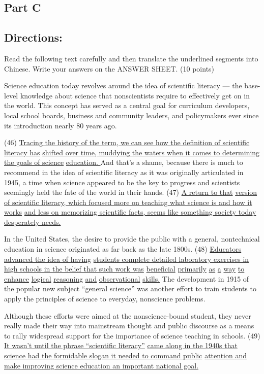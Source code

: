 \documentclass[UTF8,11pt]{ctexart}
\begin{document}
\subsection*{\textbf{Part C}}


\subsection*{\textbf{Directions:}}


Read the following text carefully and then translate the underlined segments into Chinese. Write your answers on the ANSWER SHEET. (10 points)


Science education today revolves around the idea of scientific literacy — the base-level knowledge about science that nonscientists require to effectively get on in the world. This concept has served as a central goal for curriculum developers, local school boards, business and community leaders, and policymakers ever since its introduction nearly 80 years ago.


(46) \uline{Tracing the history of the term, we can see how the definition of scientific literacy has} \uline{shifted over time, muddying the waters when it comes to determining the goals of science} \uline{education. }And that’s a shame, because there is much to recommend in the idea of scientific literacy as it was originally articulated in 1945, a time when science appeared to be the key to progress and scientists seemingly held the fate of the world in their hands. (47) \uline{A return to that} \uline{version of scientific literacy, which focused more on teaching what science is and how it works} \uline{and less on memorizing scientific facts, seems like something society today desperately needs.}


In the United States, the desire to provide the public with a general, nontechnical education in science originated as far back as the late 1800s. (48) \uline{Educators advanced the idea of having} \uline{students complete detailed laboratory exercises in high schools in the belief that such work was} \uline{beneficial} \uline{primarily} \uline{as} \uline{a} \uline{way} \uline{to} \uline{enhance} \uline{logical} \uline{reasoning} \uline{and} \uline{observational} \uline{skills.} The development in 1915 of the popular new subject “general science” was another effort to train students to apply the principles of science to everyday, nonscience problems.


Although these efforts were aimed at the nonscience-bound student, they never really made their way into mainstream thought and public discourse as a means to rally widespread support for the importance of science teaching in schools. (49) \uline{It wasn’t until the phrase “scientific literacy”} \uline{came along in the 1940s that science had the formidable slogan it needed to command public} \uline{attention and make improving science education an important national goal.}
\end{document}
